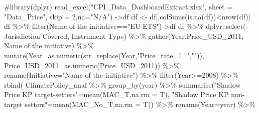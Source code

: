 \documentclass[
  letterpaper,
  DIV=11,
  numbers=noendperiod]{scrartcl}
\newenvironment{Shaded}{\begin{snugshade}}{\end{snugshade}}
\newcommand{\AttributeTok}[1]{\textcolor[rgb]{0.40,0.46,0.14}{#1}}
\newcommand{\CommentTok}[1]{\textcolor[rgb]{0.37,0.37,0.37}{#1}}
\newcommand{\DecValTok}[1]{\textcolor[rgb]{0.68,0.00,0.00}{#1}}
\newcommand{\FunctionTok}[1]{\textcolor[rgb]{0.28,0.35,0.67}{#1}}
\newcommand{\NormalTok}[1]{\textcolor[rgb]{0.00,0.46,0.62}{#1}}
\newcommand{\OtherTok}[1]{\textcolor[rgb]{0.00,0.46,0.62}{#1}}
\newcommand{\SpecialCharTok}[1]{\textcolor[rgb]{0.37,0.37,0.37}{#1}}
\newcommand{\StringTok}[1]{\textcolor[rgb]{0.13,0.47,0.30}{#1}}
\begin{document}
\begin{Shaded}
\begin{Highlighting}[]
\CommentTok{\#library(dplyr)}
\FunctionTok{read\_excel}\NormalTok{(}\StringTok{"CPI\_Data\_DashboardExtract.xlsx"}\NormalTok{,}
           \AttributeTok{sheet =} \StringTok{"Data\_Price"}\NormalTok{,}
           \AttributeTok{skip =} \DecValTok{2}\NormalTok{,}\AttributeTok{na=}\StringTok{"N/A"}\NormalTok{) }\OtherTok{{-}\textgreater{}}\NormalTok{df}
\NormalTok{df }\OtherTok{\textless{}{-}}\NormalTok{ df[,}\FunctionTok{colSums}\NormalTok{(}\FunctionTok{is.na}\NormalTok{(df))}\SpecialCharTok{\textless{}}\FunctionTok{nrow}\NormalTok{(df)]}
\NormalTok{df }\SpecialCharTok{\%\textgreater{}\%} \FunctionTok{filter}\NormalTok{(}\StringTok{\textasciigrave{}}\AttributeTok{Name of the initiative}\StringTok{\textasciigrave{}}\SpecialCharTok{==}\StringTok{"EU ETS"}\NormalTok{)}\OtherTok{{-}\textgreater{}}\NormalTok{df}
\NormalTok{df }\SpecialCharTok{\%\textgreater{}\%} 
\NormalTok{  dplyr}\SpecialCharTok{::}\FunctionTok{select}\NormalTok{(}\SpecialCharTok{{-}}\StringTok{\textasciigrave{}}\AttributeTok{Jurisdiction Covered}\StringTok{\textasciigrave{}}\NormalTok{,}\SpecialCharTok{{-}}\StringTok{\textasciigrave{}}\AttributeTok{Instrument Type}\StringTok{\textasciigrave{}}\NormalTok{) }\SpecialCharTok{\%\textgreater{}\%}
  \FunctionTok{gather}\NormalTok{(Year,Price\_USD\_2011,}\SpecialCharTok{{-}}\StringTok{\textasciigrave{}}\AttributeTok{Name of the initiative}\StringTok{\textasciigrave{}}\NormalTok{) }\SpecialCharTok{\%\textgreater{}\%}
  \FunctionTok{mutate}\NormalTok{(}\AttributeTok{Year=}\FunctionTok{as.numeric}\NormalTok{(}\FunctionTok{str\_replace}\NormalTok{(Year,}\StringTok{"Price\_rate\_1\_"}\NormalTok{,}\StringTok{""}\NormalTok{)),}
         \AttributeTok{Price\_USD\_2011=}\FunctionTok{as.numeric}\NormalTok{(Price\_USD\_2011)) }\SpecialCharTok{\%\textgreater{}\%}
  \FunctionTok{rename}\NormalTok{(}\AttributeTok{Initiative=}\StringTok{"Name of the initiative"}\NormalTok{) }\SpecialCharTok{\%\textgreater{}\%}
  \FunctionTok{filter}\NormalTok{(Year}\SpecialCharTok{\textgreater{}=}\DecValTok{2008}\NormalTok{) }\SpecialCharTok{\%\textgreater{}\%}
  \FunctionTok{rbind}\NormalTok{(}
\NormalTok{  ClimatePolicy\_anal }\SpecialCharTok{\%\textgreater{}\%} 
  \FunctionTok{group\_by}\NormalTok{(year) }\SpecialCharTok{\%\textgreater{}\%}
  \FunctionTok{summarise}\NormalTok{(}\StringTok{"Shadow Price KP target{-}setters"}\OtherTok{=}\FunctionTok{mean}\NormalTok{(MAC\_T,}\AttributeTok{na.rm =}\NormalTok{ T),          }
            \StringTok{"Shadow Price KP non{-} target setters"}\OtherTok{=}\FunctionTok{mean}\NormalTok{(MAC\_No\_T,}\AttributeTok{na.rm =}\NormalTok{ T)) }\SpecialCharTok{\%\textgreater{}\%} \FunctionTok{rename}\NormalTok{(}\AttributeTok{Year=}\NormalTok{year) }\SpecialCharTok{\%\textgreater{}\%}

\end{Highlighting}
\end{Shaded}
\end{document}
